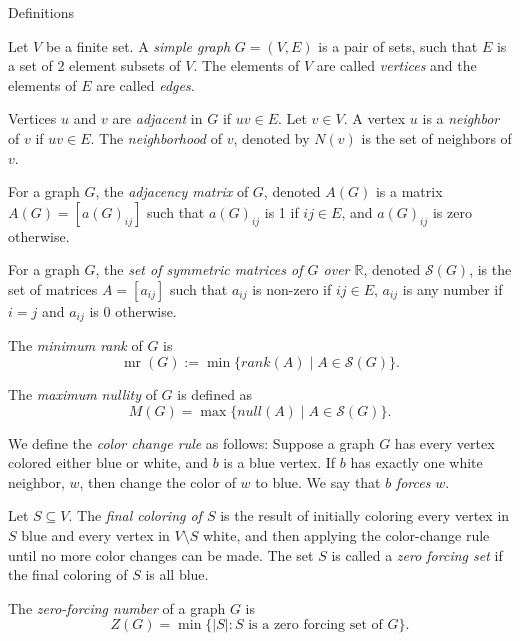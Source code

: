 \documentclass[final]{beamer}
\newcommand{\mr}{\operatorname{mr}}
\begin{document}
\begin{frame}{}
\begin{columns}[t]
\begin{column}{0.23\linewidth}
\begin{block}{Definitions}
\item Let $V$ be a finite set. A {\color{blue}\emph{simple graph}} $G=(V,E)$ is a pair of sets, such that $E$ is a set of 2 element subsets of $V$. The elements of $V$ are called {\color{blue}\emph{vertices}} and the elements of $E$ are called {\color{blue}\emph{edges}}. 
\item Vertices $u$ and $v$ are {\color{blue}\emph{adjacent}} in $G$ if $uv \in E$. Let $v \in V$. A vertex $u$ is a {\color{blue}\emph{neighbor}} of $v$ if $uv \in E$. The {\color{blue}\emph{neighborhood}} of $v$, denoted by $N(v)$ is the set of neighbors of $v$.
\item For a graph $G$, the {\color{blue}\emph{adjacency matrix}} of $G$, denoted $A(G)$ is a matrix $A(G) = [a(G)_{ij}]$ such that $a(G)_{ij}$ is 1 if $ij \in E$, and $a(G)_{ij}$ is zero otherwise. 
\item For a graph $G$, the {\color{blue}\emph{set of symmetric matrices of $G$ over $\mathbb{R}$}}, denoted $\mathcal{S}(G)$,  is the set of matrices $A=[a_{ij}]$ such that $a_{ij}$ is non-zero if $ij\in E$, $a_{ij}$ is any number if $i=j$ and $a_{ij}$ is $0$ otherwise. 
\item The {\color{blue}\emph{minimum rank}} of $G$ is 
\[
\mr(G) := \min\{rank(A) \mid A \in \mathcal{S}(G)\}.
\]
\item The {\color{blue}\emph{maximum nullity}} of $G$ is defined as 
\[
M(G) = \max\{null(A) \mid A \in \mathcal{S}(G)\}.
\]
\item We define the {\color{blue}\emph{color change rule}} as follows: Suppose a graph $G$ has every vertex colored either blue or white, and $b$ is a blue vertex. If $b$ has exactly one white neighbor, $w$, then change the color of $w$ to blue. We say that $b$ {\color{blue}\emph{forces }}$w$.
\item Let $S \subseteq V$. The {\color{blue}\emph{final coloring of $S$}} is
	the result of initially coloring every vertex in $S$ blue and every
	vertex in $V \setminus S$ white, and then applying the color-change
	rule until no more color changes can be made. The set $S$ is called a
	{\color{blue}\emph{zero forcing set}} if the final coloring of $S$ is all blue. 
\item The {\color{blue}\emph{zero-forcing number}} of a graph $G$ is 
\[
Z(G) = \min\{|S| : S\text{ is a zero forcing set of }G\}.
\] 


\end{block}
\end{column}
\end{columns}
\end{frame}
\end{document}
